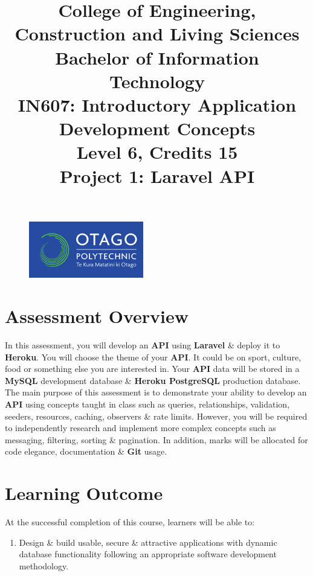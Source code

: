 \documentclass{article}
\author{}
\begin{document}
\begin{figure}
    \centering
    \includegraphics[width=50mm]{../img/logo.png}
\end{figure}

\title{College of Engineering, Construction and Living Sciences\\Bachelor of Information Technology\\IN607: Introductory Application Development Concepts\\Level 6, Credits 15\\\textbf{Project 1: Laravel API}}
\date{}
\maketitle

\section*{Assessment Overview}
In this assessment, you will develop an \textbf{API} using \textbf{Laravel} \& deploy it to \textbf{Heroku}. You will choose the theme of your \textbf{API}. It could be on sport, culture, food or something else you are interested in. Your \textbf{API} data will be stored in a \textbf{MySQL} development database \& \textbf{Heroku PostgreSQL} production database. The main purpose of this assessment is to demonstrate your ability to develop an \textbf{API} using concepts taught in class such as queries, relationships, validation, seeders, resources, caching, observers \& rate limits. However, you will be required to independently research and implement more complex concepts such as messaging, filtering, sorting \& pagination. In addition, marks will be allocated for code elegance, documentation \& \textbf{Git} usage. 

\section*{Learning Outcome}
At the successful completion of this course, learners will be able to:
\begin{enumerate}
    \item Design \& build usable, secure \& attractive applications with dynamic database functionality following an appropriate software development methodology.
\end{enumerate}
\end{document}
